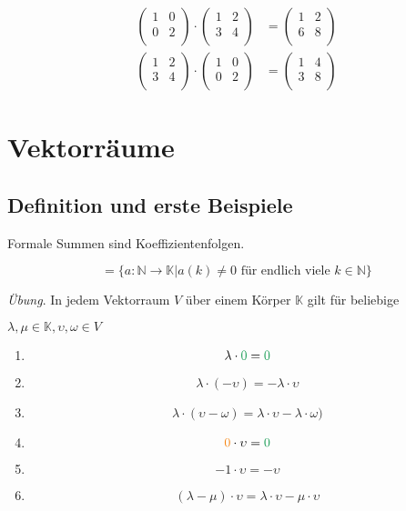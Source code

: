 \documentclass{article}
\begin{document}
\begin{align*}
  \begin{pmatrix}
    1 & 0 \\
    0 & 2 \\
  \end{pmatrix}
  \cdot
  \begin{pmatrix}
    1 & 2 \\
    3 & 4 \\
  \end{pmatrix}
  &=
  \begin{pmatrix}
    1 & 2 \\
    6 & 8 \\
  \end{pmatrix} \\
  \begin{pmatrix}
    1 & 2 \\
    3 & 4 \\
  \end{pmatrix}
  \cdot
  \begin{pmatrix}
    1 & 0 \\
    0 & 2 \\
  \end{pmatrix}
  &=
  \begin{pmatrix}
    1 & 4 \\
    3 & 8 \\
  \end{pmatrix}
\end{align*}

\section{Vektorräume}

\subsection{Definition und erste Beispiele}

Formale Summen sind Koeffizientenfolgen.

\[
  = \{ a \colon \mathbb{N} \to \mathbb{K} | a(k) \ne 0 \text{ für endlich viele } k \in \mathbb{N} \}
\]

\emph{Übung}. In jedem Vektorraum $V$ über einem Körper $\mathbb{K}$ gilt für beliebige

$\lambda, \mu \in \mathbb{K}, \upsilon, \omega \in V$

\begin{enumerate}[1)]
\item
  \[
    \lambda \cdot {\color{ForestGreen}0} = {\color{ForestGreen}0}
  \]
\item
  \[
    \lambda \cdot (-\upsilon) = - \lambda \cdot \upsilon
  \]
\item
  \[
    \lambda \cdot (\upsilon - \omega) = \lambda \cdot \upsilon - \lambda \cdot \omega)
  \]
\item
  \[
    {\color{BurntOrange}0} \cdot \upsilon = {\color{ForestGreen}0}
  \]
\item
  \[
    -1 \cdot \upsilon = - \upsilon
  \]
\item
  \[
    (\lambda - \mu) \cdot \upsilon = \lambda \cdot \upsilon - \mu \cdot \upsilon
  \]
\end{enumerate}
\end{document}
